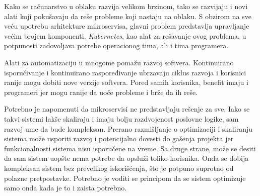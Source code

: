Kako se računarstvo u oblaku razvija velikom brzinom, tako se razvijaju i novi alati 
koji pokušavaju da reše probleme koji nastaju na oblaku. S obzirom na sve veću upotrebu 
arhitekture mikroservisa, glavni problem predstavlja upravljanje većim brojem komponenti.
\textit{Kubernetes}, kao alat za rešavanje ovog problema, u potpunosti zadovoljava 
potrebe operacionog tima, ali i tima programera.

Alati za automatizaciju u mnogome pomažu razvoj softvera. Kontinuirano isporučivanje 
i kontinuirano raspoređivanje ubrzavaju ciklus razvoja i korisnici ranije mogu dobiti 
nove verzije softvera. Pored samih korisnika, benefit imaju i programeri jer mogu 
ranije da uoče probleme i brže da ih reše.

Potrebno je napomenuti da mikroservisi ne predstavljaju rešenje za sve. Iako se takvi 
sistemi lakše skaliraju i imaju bolju razdvojenost poslovne logike, sam razvoj ume da 
bude kompleksan. Prerano razmišljanje o optimizaciji i skaliranju sistema može usporiti 
razvoj i potencijalno dovesti do gašenja projekta jer funkcionalnosti sistema nisu 
isporučene na vreme. Sa druge strane, može se desiti da sam sistem uopšte nema potrebe 
da opsluži toliko korisnika. Onda se dobija kompleksan sistem bez prevelikog iskorišćenja,
što je potpuno suprotno od polazne pretpostavke. Potrebno je voditi se principom da se 
sistem optimizuje samo onda kada je to i zaista potrebno.

